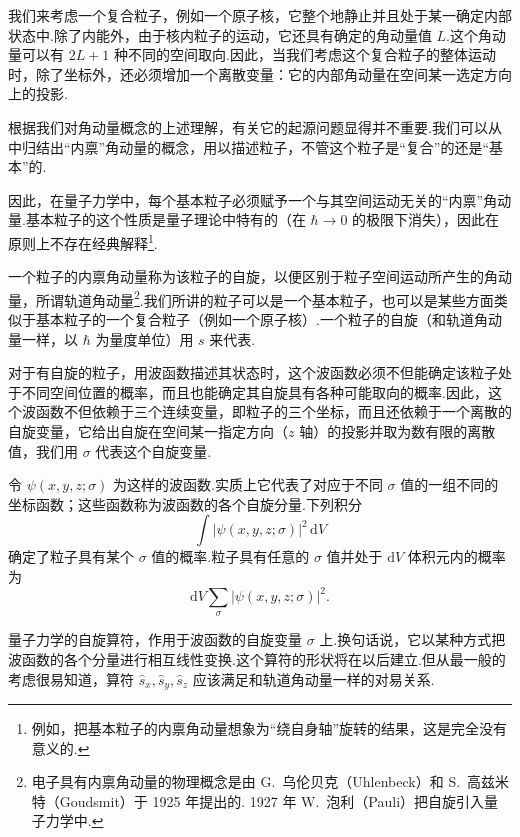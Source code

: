 我们来考虑一个复合粒子，例如一个原子核，它整个地静止并且处于某一确定内部状态中.除了内能外，由于核内粒子的运动，它还具有确定的角动量值 $L$.这个角动量可以有 $2L+1$ 种不同的空间取向.因此，当我们考虑这个复合粒子的整体运动时，除了坐标外，还必须增加一个离散变量：它的内部角动量在空间某一选定方向上的投影.

根据我们对角动量概念的上述理解，有关它的起源问题显得并不重要.我们可以从中归结出“内禀”角动量的概念，用以描述粒子，不管这个粒子是“复合”的还是“基本”的.

因此，在量子力学中，每个基本粒子必须赋予一个与其空间运动无关的“内禀”角动量.基本粒子的这个性质是量子理论中特有的（在 $\hbar\to0$ 的极限下消失），因此在原则上不存在经典解释\footnote{例如，把基本粒子的内禀角动量想象为“绕自身轴”旋转的结果，这是完全没有意义的.}.

一个粒子的内禀角动量称为该粒子的自旋，以便区别于粒子空间运动所产生的角动量，所谓轨道角动量\footnote{电子具有内禀角动量的物理概念是由 G.~乌伦贝克（Uhlenbeck）和 S.~高兹米特（Goudsmit）于 1925 年提出的. 1927 年 W.~泡利（Pauli）把自旋引入量子力学中.}.我们所讲的粒子可以是一个基本粒子，也可以是某些方面类似于基本粒子的一个复合粒子（例如一个原子核）.一个粒子的自旋（和轨道角动量一样，以 $\hbar$ 为量度单位）用 $s$ 来代表.

对于有自旋的粒子，用波函数描述其状态时，这个波函数必须不但能确定该粒子处于不同空间位置的概率，而且也能确定其自旋具有各种可能取向的概率.因此，这个波函数不但依赖于三个连续变量，即粒子的三个坐标，而且还依赖于一个离散的自旋变量，它给出自旋在空间某一指定方向（$z$ 轴）的投影并取为数有限的离散值，我们用 $\sigma$ 代表这个自旋变量.

令 $\psi(x,y,z;\sigma)$ 为这样的波函数.实质上它代表了对应于不同 $\sigma$ 值的一组不同的坐标函数；这些函数称为波函数的各个自旋分量.下列积分
\begin{equation*}
  \int|\psi(x,y,z;\sigma)|^2\,\mathrm{d}V
\end{equation*}
确定了粒子具有某个 $\sigma$ 值的概率.粒子具有任意的 $\sigma$ 值并处于 $\mathrm{d}V$ 体积元内的概率为
\begin{equation*}
  \mathrm{d}V\sum_{\sigma}|\psi(x,y,z;\sigma)|^2.
\end{equation*}

量子力学的自旋算符，作用于波函数的自旋变量 $\sigma$ 上.换句话说，它以某种方式把波函数的各个分量进行相互线性变换.这个算符的形状将在以后建立.但从最一般的考虑很易知道，算符 $\hat{s}_x,\hat{s}_y,\hat{s}_z$ 应该满足和轨道角动量一样的对易关系.

